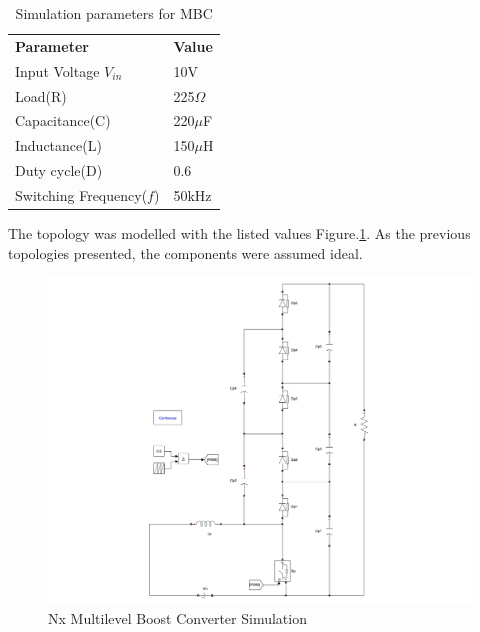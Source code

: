 \begin{table}[H]
\begin{center}
\caption {Simulation parameters for MBC} \label{tab:MBC} 
\begin{tabular}{|l|l|}
\cline{1-2}
\textbf{Parameter} & \textbf{Value}  \\ \cline{1-2}
Input Voltage $V_{in}$          &      10V   \\ \cline{1-2}
Load(R)   & 225$\Omega$           \\ \cline{1-2}
Capacitance(C)          &       220$\mu$F     \\ \cline{1-2}
Inductance(L)          &      150$\mu$H      \\ \cline{1-2}
Duty cycle(D)          &     0.6       \\ \cline{1-2}
Switching Frequency($f$)          &      50kHz      \\ \cline{1-2}
\end{tabular}
\end{center}
\end{table}
\vspace{-6mm}
The  topology was modelled with the listed values Figure.\ref{fig:MBC_Sim}. As the previous topologies presented, the components were assumed ideal.
\vspace{-4mm}
\begin{figure}[H]
   \centering
   \includegraphics[width=\textwidth]{figures/yMultilevel/MCB_Simulation.pdf}
   \vspace{-4mm}
    \caption{Nx Multilevel Boost Converter Simulation}
	\label{fig:MBC_Sim}
\end{figure}
